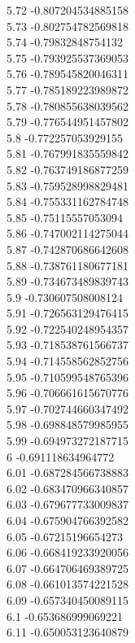 {5.72	-0.807204534885158\\
5.73	-0.802754782569818\\
5.74	-0.79832848754132\\
5.75	-0.793925537369053\\
5.76	-0.789545820046311\\
5.77	-0.785189223989872\\
5.78	-0.780855638039562\\
5.79	-0.776544951457802\\
5.8	-0.772257053929155\\
5.81	-0.767991835559842\\
5.82	-0.763749186877259\\
5.83	-0.759528998829481\\
5.84	-0.755331162784748\\
5.85	-0.75115557053094\\
5.86	-0.747002114275044\\
5.87	-0.742870686642608\\
5.88	-0.738761180677181\\
5.89	-0.734673489839743\\
5.9	-0.730607508008124\\
5.91	-0.726563129476415\\
5.92	-0.722540248954357\\
5.93	-0.718538761566737\\
5.94	-0.714558562852756\\
5.95	-0.710599548765396\\
5.96	-0.706661615670776\\
5.97	-0.702744660347492\\
5.98	-0.698848579985955\\
5.99	-0.694973272187715\\
6	-0.691118634964772\\
6.01	-0.687284566738883\\
6.02	-0.683470966340857\\
6.03	-0.679677733009837\\
6.04	-0.675904766392582\\
6.05	-0.67215196654273\\
6.06	-0.668419233920056\\
6.07	-0.664706469389725\\
6.08	-0.661013574221528\\
6.09	-0.657340450089115\\
6.1	-0.653686999069221\\
6.11	-0.650053123640879\\
}
